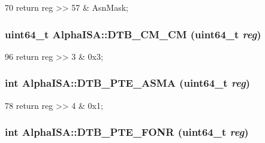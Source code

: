 \begin{DoxyCode}
70 { return reg >> 57 & AsnMask; }
\end{DoxyCode}
\hypertarget{namespaceAlphaISA_ad60009a95542d624d42cf5134774bda8}{
\subsubsection[{DTB\_\-CM\_\-CM}]{\setlength{\rightskip}{0pt plus 5cm}uint64\_\-t AlphaISA::DTB\_\-CM\_\-CM (uint64\_\-t {\em reg})}}
\label{namespaceAlphaISA_ad60009a95542d624d42cf5134774bda8}



\begin{DoxyCode}
96 { return reg >> 3 & 0x3; }
\end{DoxyCode}
\hypertarget{namespaceAlphaISA_a81680a8f0a79643e10fc7337821f5f37}{
\subsubsection[{DTB\_\-PTE\_\-ASMA}]{\setlength{\rightskip}{0pt plus 5cm}int AlphaISA::DTB\_\-PTE\_\-ASMA (uint64\_\-t {\em reg})}}
\label{namespaceAlphaISA_a81680a8f0a79643e10fc7337821f5f37}



\begin{DoxyCode}
78 { return reg >> 4 & 0x1; }
\end{DoxyCode}
\hypertarget{namespaceAlphaISA_a4cba73d4105288236ba519f745492c0b}{
\subsubsection[{DTB\_\-PTE\_\-FONR}]{\setlength{\rightskip}{0pt plus 5cm}int AlphaISA::DTB\_\-PTE\_\-FONR (uint64\_\-t {\em reg})}}
\label{namespaceAlphaISA_a4cba73d4105288236ba519f745492c0b}



